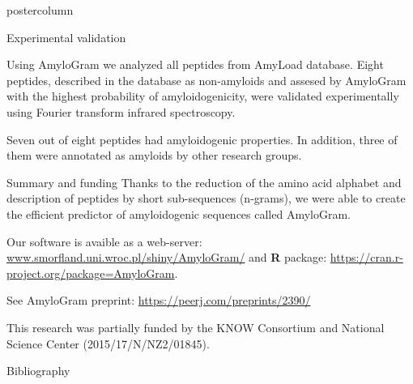 \documentclass[final]{beamer}
\makeatletter
\def\maxwidth{ %
  \ifdim\Gin@nat@width>\linewidth
    \linewidth
  \else
    \Gin@nat@width
  \fi
}
\newenvironment{knitrout}{}{} %
\makeatother
\begin{document}
\begin{frame}
\begin{columns}
\begin{column}{.48\textwidth}
\begin{beamercolorbox}[center,wd=\textwidth]{postercolumn}
\begin{minipage}[T]{.95\textwidth}
{\begin{block}{Experimental validation}

Using AmyloGram we analyzed all peptides from AmyLoad database. Eight peptides, described in the database as non-amyloids and assesed by AmyloGram with the highest probability of amyloidogenicity, were validated experimentally using Fourier transform infrared spectroscopy.

% 
% 
% 
% 
% 

Seven out of eight peptides had amyloidogenic properties. In addition, three of them were annotated as amyloids by other research groups.

\end{block}
\vfill


\begin{block}{Summary and funding}
Thanks to the reduction of the amino acid alphabet and description of peptides by 
short sub-sequences (n-grams), we were able to create the efficient predictor 
of amyloidogenic sequences called AmyloGram.

\bigskip

Our software is avaible as a web-server: \url{www.smorfland.uni.wroc.pl/shiny/AmyloGram/} and \textbf{R} package: \url{https://cran.r-project.org/package=AmyloGram}.

\bigskip

See AmyloGram preprint: \url{https://peerj.com/preprints/2390/}

\small{This research was partially funded by the KNOW Consortium and National Science Center (2015/17/N/NZ2/01845).}

\end{block}
\vfill

 \begin{block}{Bibliography}
  \tiny{
  
  
  }
  \end{block}
  \vfill  


}
\end{minipage}
\end{beamercolorbox}
\end{column}
\end{columns}  
\end{frame}
\end{document}
